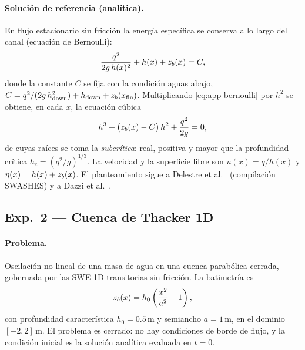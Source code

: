 \paragraph{Solución de referencia (analítica).}
En flujo estacionario sin fricción la energía específica se conserva a lo
largo del canal (ecuación de Bernoulli):
\begin{equation}
  \frac{q^2}{2 g\,h(x)^2} + h(x) + z_b(x) = C,
  \label{eq:app-bernoulli}
\end{equation}
donde la constante $C$ se fija con la condición aguas abajo,
$C = q^2/(2 g\,h_{\text{down}}^2) + h_{\text{down}} + z_b(x_{\text{fin}})$.
Multiplicando \eqref{eq:app-bernoulli} por $h^2$ se obtiene, en cada $x$, la
ecuación cúbica
\begin{equation}
  h^3 + \bigl(z_b(x) - C\bigr)\,h^2 + \frac{q^2}{2 g} = 0,
\end{equation}
de cuyas raíces se toma la \emph{subcrítica}: real, positiva y mayor que la
profundidad crítica $h_c = (q^2/g)^{1/3}$. La velocidad y la superficie libre
son $u(x) = q/h(x)$ y $\eta(x) = h(x) + z_b(x)$. El planteamiento sigue a
Delestre et al.\ \cite{delestre2013} (compilación SWASHES) y a Dazzi et al.\
\cite{dazzi2024}.

\subsection{Exp.\ 2 --- Cuenca de Thacker 1D}
\label{app:exp2}

\paragraph{Problema.}
Oscilación no lineal de una masa de agua en una cuenca parabólica cerrada,
gobernada por las SWE 1D transitorias sin fricción. La batimetría es
\begin{equation}
  z_b(x) = h_0\left(\frac{x^2}{a^2} - 1\right),
\end{equation}
con profundidad característica $h_0 = 0.5$\,m y semiancho $a = 1$\,m, en el
dominio $[-2, 2]$\,m. El problema es cerrado: no hay condiciones de borde de
flujo, y la condición inicial es la solución analítica evaluada en $t = 0$.

